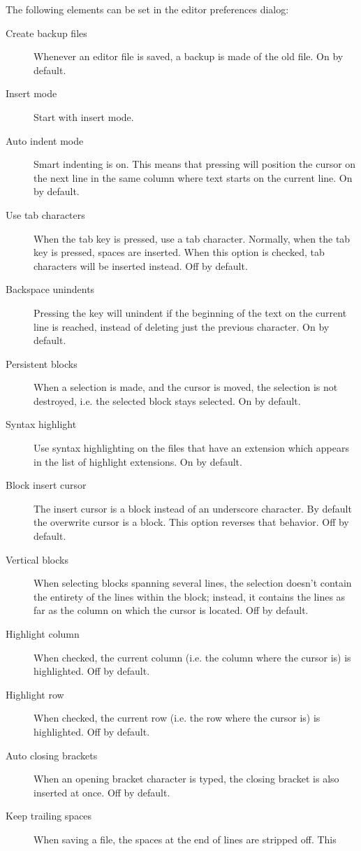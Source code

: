 The following elements can be set in the editor preferences dialog:
\begin{description}
\item[Create backup files]
Whenever an editor file is saved, a backup is made of the old file. On by
default.
\item[Insert mode] Start with insert mode.
\item[Auto indent mode]
Smart indenting is on. This means that pressing  will position the
cursor on the next line in the same column where text starts on the current
line. On by default.
\item[Use tab characters]
When the tab key is pressed, use a tab character. Normally, when the tab key
is pressed, spaces are inserted. When this option is checked, tab characters
will be inserted instead. Off by default.
\item[Backspace unindents]
Pressing the  key will unindent if the beginning of the text on
the current line is reached, instead of deleting just the previous
character. On by default.
\item[Persistent blocks]
When a selection is made, and the cursor is moved, the selection is not
destroyed, i.e. the selected block stays selected. On by default.
\item[Syntax highlight]
Use syntax highlighting on the files that have an extension which appears in
the list of highlight extensions. On by default.
\item[Block insert cursor]
The insert cursor is a block instead of an underscore character. By default
the overwrite cursor is a block. This option reverses that behavior. Off by
default.
\item[Vertical blocks]
When selecting blocks spanning several lines, the selection doesn't 
contain the entirety of the lines within the block; instead, it 
contains the lines as far as the column on which the cursor is located.
Off by default.
\item[Highlight column]
When checked, the current column (i.e. the column where the cursor is) is
highlighted. Off by default.
\item[Highlight row]
When checked, the current row (i.e. the row where the cursor is) is
highlighted. Off by default.
\item[Auto closing brackets]
When an opening bracket character is typed, the closing bracket is also
inserted at once. Off by default.
\item[Keep trailing spaces]
When saving a file, the spaces at the end of lines are stripped off. This

\end{description}
